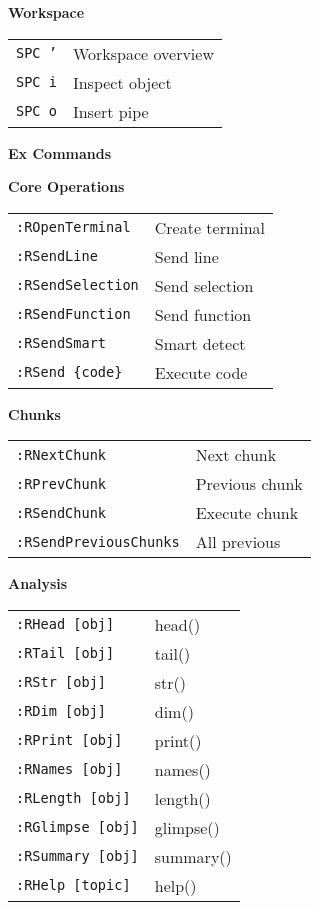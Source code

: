 \documentclass[10pt,landscape,a4paper]{article}
\begin{document}
\begin{multicols}{3}
\vspace{3pt}
\textbf{Workspace}\\
\begin{tabular}{@{}L{0.8cm}L{2.2cm}@{}}
\texttt{SPC '} & Workspace overview \\
\texttt{SPC i} & Inspect object \\
\texttt{SPC o} & Insert pipe \\
\end{tabular}

\columnbreak

\textbf{\large Ex Commands}

\textbf{Core Operations}\\
\begin{tabular}{@{}L{1.8cm}L{1.4cm}@{}}
\texttt{:ROpenTerminal} & Create terminal \\
\texttt{:RSendLine} & Send line \\
\texttt{:RSendSelection} & Send selection \\
\texttt{:RSendFunction} & Send function \\
\texttt{:RSendSmart} & Smart detect \\
\texttt{:RSend \{code\}} & Execute code \\
\end{tabular}

\vspace{3pt}
\textbf{Chunks}\\
\begin{tabular}{@{}L{1.8cm}L{1.4cm}@{}}
\texttt{:RNextChunk} & Next chunk \\
\texttt{:RPrevChunk} & Previous chunk \\
\texttt{:RSendChunk} & Execute chunk \\
\texttt{:RSendPreviousChunks} & All previous \\
\end{tabular}

\vspace{3pt}
\textbf{Analysis}\\
\begin{tabular}{@{}L{1.8cm}L{1.4cm}@{}}
\texttt{:RHead [obj]} & head() \\
\texttt{:RTail [obj]} & tail() \\
\texttt{:RStr [obj]} & str() \\
\texttt{:RDim [obj]} & dim() \\
\texttt{:RPrint [obj]} & print() \\
\texttt{:RNames [obj]} & names() \\
\texttt{:RLength [obj]} & length() \\
\texttt{:RGlimpse [obj]} & glimpse() \\
\texttt{:RSummary [obj]} & summary() \\
\texttt{:RHelp [topic]} & help() \\
\end{tabular}


\end{multicols}
\end{document}
